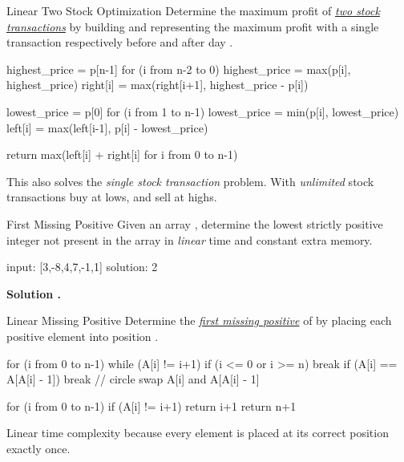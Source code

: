 \documentclass{cognito}
\begin{document}
\begin{note}{Linear Two Stock Optimization}
	Determine the maximum profit of \hyperref[note:Two Stock Transactions]{\it two stock transactions}
	by building  and  representing the maximum profit with a single transaction
	respectively before and after day .
	
	\begin{largecode}
 highest_price = p[n-1]
 for (i from n-2 to 0)
 	highest_price = max(p[i], highest_price)
	right[i] = max(right[i+1], highest_price - p[i])

 lowest_price = p[0]
 for (i from 1 to n-1)
	lowest_price = min(p[i], lowest_price)
	left[i] = max(left[i-1], p[i] - lowest_price)
	
 return max(left[i] + right[i] for i from 0 to n-1)
	\end{largecode}
	
	\begin{remark}
		This also solves the {\it single stock transaction} problem.
		With {\it unlimited} stock transactions buy at lows, and sell at highs.
	\end{remark}
	\vspace{-5pt}
\end{note}

\begin{note}{First Missing Positive}
	Given an array , determine the lowest strictly positive integer not present in the array
	in \emph{linear} time and constant extra memory.

	\begin{largecode}
 input: [3,-8,4,7,-1,1]
 solution: 2
	\end{largecode}
	\bf Solution \hyperref[note:Linear Missing Positive]{\solutionref}.
\end{note}

\begin{note}{Linear Missing Positive}
	Determine the \hyperref[note:First Missing Positive]{\it first missing positive} of  by
	placing each positive element  into position .
	
	\begin{largecode}
 for (i from 0 to n-1)
 	while (A[i] != i+1)
		if (i <= 0 or i >= n) break
		if (A[i] == A[A[i] - 1]) break  // circle
		swap A[i] and A[A[i] - 1]
		
 for (i from 0 to n-1) if (A[i] != i+1) return i+1
 return n+1
	\end{largecode}
	\begin{remark} Linear time complexity because every element  is placed at its correct position exactly once. \end{remark}
	\vspace{-5pt}
\end{note}
\end{document}
